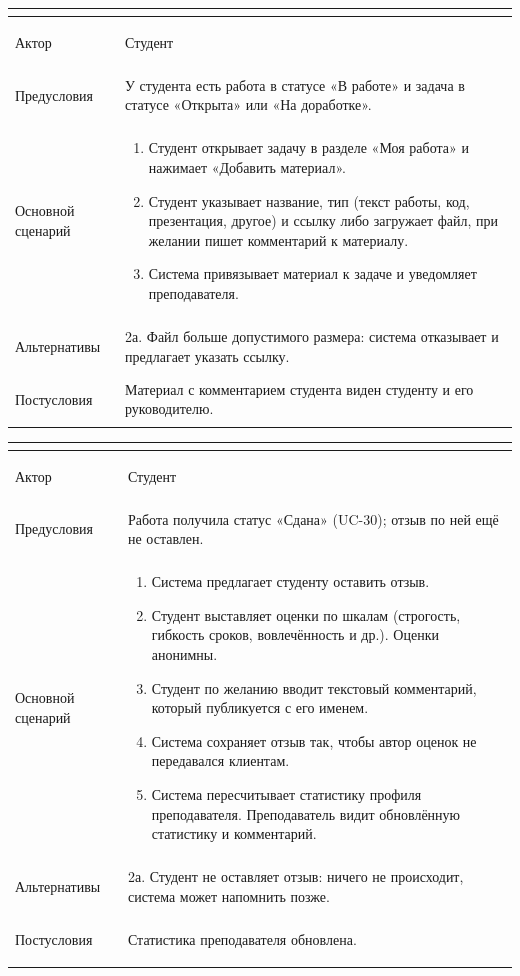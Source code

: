 \documentclass[a4paper,12pt]{article}
\newenvironment{ucd}[3]{%
  \needspace{10\baselineskip}
  \begin{longtable}{|>{\bfseries\raggedright\arraybackslash}p{3.0cm}|p{11.8cm}|}
  \hline
  \multicolumn{2}{|l|}{\textbf{#1.\ #2}}\\ \hline
  Актор & #3\\ \hline
}{\end{longtable}}
\newcommand{\steps}[1]{\begin{enumerate}[nosep,leftmargin=*]#1\end{enumerate}}
\begin{document}
\begin{ucd}{UC-9}{Добавить материал к задаче}{Студент}
Предусловия & У студента есть работа в статусе «В работе» и задача в статусе «Открыта» или «На доработке».\\ \hline
Основной сценарий & \steps{
 \item Студент открывает задачу в разделе «Моя работа» и нажимает «Добавить материал».
 \item Студент указывает название, тип (текст работы, код, презентация, другое) и ссылку либо загружает файл, при желании пишет комментарий к материалу.
 \item Система привязывает материал к задаче и уведомляет преподавателя.}\\ \hline
Альтернативы & 2а. Файл больше допустимого размера: система отказывает и предлагает указать ссылку.\\ \hline
Постусловия & Материал с комментарием студента виден студенту и его руководителю.\\ \hline
\end{ucd}

\begin{ucd}{UC-10}{Оставить отзыв о преподавателе после сдачи работы}{Студент}
Предусловия & Работа получила статус «Сдана» (UC-30); отзыв по ней ещё не оставлен.\\ \hline
Основной сценарий & \steps{
 \item Система предлагает студенту оставить отзыв.
 \item Студент выставляет оценки по шкалам (строгость, гибкость сроков, вовлечённость и др.). Оценки анонимны.
 \item Студент по желанию вводит текстовый комментарий, который публикуется с его именем.
 \item Система сохраняет отзыв так, чтобы автор оценок не передавался клиентам.
 \item Система пересчитывает статистику профиля преподавателя. Преподаватель видит обновлённую статистику и комментарий.}\\ \hline
Альтернативы & 2а. Студент не оставляет отзыв: ничего не происходит, система может напомнить позже.\\ \hline
Постусловия & Статистика преподавателя обновлена.\\ \hline
\end{ucd}
\end{document}
